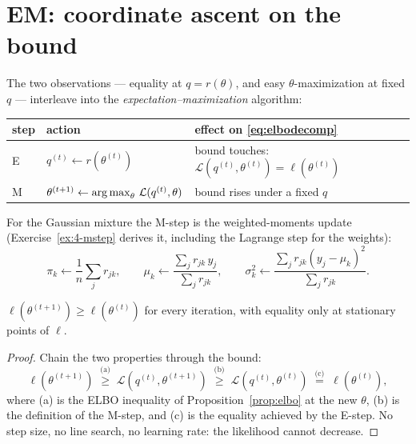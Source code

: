 \section{EM: coordinate ascent on the bound}\label{sec:em}

The two observations --- equality at $q = r(\theta)$, and easy
$\theta$-maximization at fixed $q$ --- interleave into the
\emph{expectation--maximization} algorithm:

\begin{center}
\begin{tabular}{@{}lll@{}}
\toprule
step & action & effect on \eqref{eq:elbodecomp} \\
\midrule
E & $q^{(t)} \leftarrow r(\theta^{(t)})$
  & bound touches: $\mathcal{L}(q^{(t)}, \theta^{(t)}) = \ell(\theta^{(t)})$ \\
M & $\theta^{(t+1)} \leftarrow \operatorname*{arg\,max}_\theta\,
    \mathcal{L}(q^{(t)}, \theta)$
  & bound rises under a fixed $q$ \\
\bottomrule
\end{tabular}
\end{center}

For the Gaussian mixture the M-step is the weighted-moments update
(Exercise~\ref{ex:4-mstep} derives it, including the Lagrange step for the
weights):
\begin{equation}\label{eq:mstep}
  \pi_k \leftarrow \frac{1}{n}\sum_j r_{jk}, \qquad
  \mu_k \leftarrow \frac{\sum_j r_{jk}\, y_j}{\sum_j r_{jk}}, \qquad
  \sigma_k^2 \leftarrow \frac{\sum_j r_{jk}(y_j - \mu_k)^2}{\sum_j r_{jk}}.
\end{equation}

\begin{theorem}[Monotonicity of EM]\label{thm:em}
$\ell(\theta^{(t+1)}) \ge \ell(\theta^{(t)})$ for every iteration, with
equality only at stationary points of $\ell$.
\end{theorem}

\begin{proof}
Chain the two properties through the bound:
\[
  \ell(\theta^{(t+1)})
  \;\overset{\text{(a)}}{\ge}\;
  \mathcal{L}(q^{(t)}, \theta^{(t+1)})
  \;\overset{\text{(b)}}{\ge}\;
  \mathcal{L}(q^{(t)}, \theta^{(t)})
  \;\overset{\text{(c)}}{=}\;
  \ell(\theta^{(t)}),
\]
where (a) is the ELBO inequality of Proposition~\ref{prop:elbo} at the new
$\theta$, (b) is the definition of the M-step, and (c) is the equality
achieved by the E-step. No step size, no line search, no learning rate:
the likelihood cannot decrease.
\end{proof}

